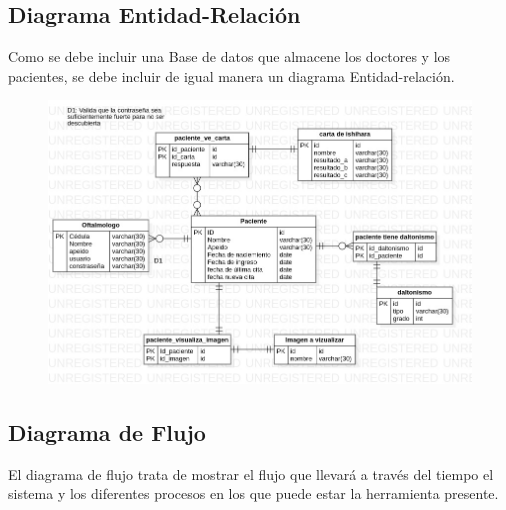 \documentclass[10pt]{article}
\begin{document}
\newpage

\subsection{Diagrama Entidad-Relación}

Como se debe incluir una Base de datos que almacene los doctores y los pacientes, se debe incluir de igual manera un diagrama Entidad-relación.

\begin{figure}[H]
	\begin{center}
\includegraphics[scale = 0.50]{UML/ERDDiagram1.jpg}
	\end{center} 
\end{figure}

\newpage

\subsection{Diagrama de Flujo}

El diagrama de flujo trata de mostrar el flujo que llevará a través del tiempo el sistema y los diferentes procesos en los que puede estar la herramienta presente.
\end{document}
